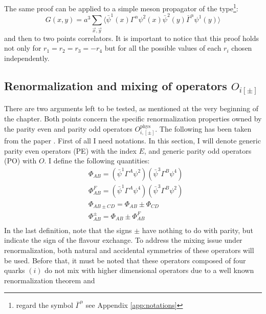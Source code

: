 \documentclass[english, LaM, oneside, noexaminfo]{sapthesis}
\newcommand{\la}{\langle}
\newcommand{\ra}{\rangle}
\begin{document}
The same proof can be applied to a simple meson propagator of the type\footnote{regard the symbol $\bar\Gamma^\alpha$ see Appendix \ref{app:notations}}:
\begin{equation*}
    G(x,y)=a^3\sum_{\vec x, \vec y} \Big\la \bar \psi^1 (x) \Gamma^\alpha \psi^2 (x) \bar\psi^2 (y) \bar\Gamma^\alpha \psi^1 (y) \Big\ra 
\end{equation*}
and then to two points correlators.
It is important to notice that this proof holds not only for $r_1=r_2=r_3=-r_4$ but for all the possible values of each $r_i$ chosen independently.


\subsection{Renormalization and mixing of operators $O_{i[\pm]}$}\label{sec:renormalization-properties}
\noindent
There are two arguments left to be tested, as mentioned at the very beginning of the chapter.
Both points concern the specific renormalization properties owned by the parity even and parity odd operators $O_{i,[\pm]}^\text{phys}$.
The following has been taken from the paper \cite{DoniniMartinelliOperators}.
\newline
First of all I need notations.
In this section, I will denote generic parity even operators (PE) with the index ${E}$, and generic parity odd operators (PO) with ${O}$.
I define the following quantities:
\begin{equation*}
    \begin{split}
        & \Phi_{AB} = \left( \bar \psi^1 \Gamma^A \psi^2 \right) \left( \bar \psi^3 \Gamma^B \psi^4 \right) \\
        & \Phi_{AB}^F = \left( \bar \psi^1 \Gamma^A \psi^4 \right) \left( \bar \psi^3 \Gamma^B \psi^2 \right) \\
        & \Phi_{AB \pm CD} = \Phi_{AB} \pm \Phi_{CD} \\
        & \Phi_{AB}^\pm = \Phi_{AB} \pm \Phi_{AB}^F \\
    \end{split}
\end{equation*}
In the last definition, note that the signs $\pm$ have nothing to do with parity, but indicate the sign of the flavour exchange.
\newline
To address the mixing issue under renormalization, both natural and accidental symmetries of these operators will be used.
Before that, it must be noted that these operators composed of four quarks
$(i)$ do not mix with higher dimensional operators due to a well known renormalization theorem \cite{Collins} and
\end{document}
